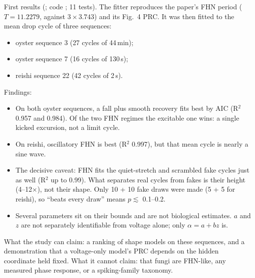\begin{instructions}
First results (; code ; 11 tests). The fitter
reproduces the paper's FHN period ($T=11.2279$, against $3\times3.743$) and its Fig.~4 PRC. It was then fitted to the
mean drop cycle of three sequences:
\begin{itemize}
  \item oyster sequence 3 (27 cycles of 44\,min);
  \item oyster sequence 7 (16 cycles of 130\,s);
  \item reishi sequence 22 (42 cycles of 2\,s).
\end{itemize}
Findings:
\begin{itemize}
  \item On both oyster sequences, a fall plus smooth recovery fits best by AIC (R$^2$ 0.957 and 0.984). Of the two FHN
        regimes the excitable one wins: a single kicked excursion, not a limit cycle.
  \item On reishi, oscillatory FHN is best (R$^2$ 0.997), but that mean cycle is nearly a sine wave.
  \item The decisive caveat: FHN fits the quiet-stretch and scrambled fake cycles just as well (R$^2$ up to 0.99). What
        separates real cycles from fakes is their height (4--12$\times$), not their shape. Only 10 + 10 fake draws were
        made (5 + 5 for reishi), so ``beats every draw'' means $p\lesssim$ 0.1--0.2.
  \item Several parameters sit on their bounds and are not biological estimates. $a$ and $z$ are not separately
        identifiable from voltage alone; only $\alpha=a+bz$ is.
\end{itemize}
What the study can claim: a ranking of shape models on these sequences, and a demonstration that a voltage-only
model's PRC depends on the hidden coordinate held fixed. What it cannot claim: that fungi are FHN-like, any measured
phase response, or a spiking-family taxonomy.
\end{instructions}

